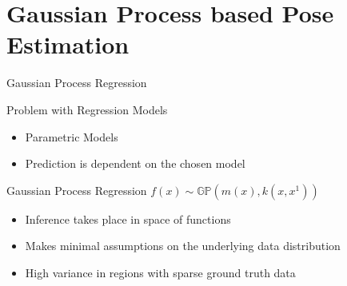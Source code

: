 \section{Gaussian Process based Pose Estimation}
\begin{frame}{Gaussian Process Regression}
\begin{block}{Problem with Regression Models}
\begin{itemize}
\item Parametric Models
\item Prediction is dependent on the chosen model
\end{itemize}
\end{block}
\begin{block}{Gaussian Process Regression}
$f(x) \sim \mathbb{GP}(m(x),k(x,x^1))$
\begin{itemize}
\item Inference takes place in space of functions
\item Makes minimal assumptions on the underlying data distribution
\item High variance in regions with sparse ground truth data
\end{itemize}
\end{block}
\end{frame}

